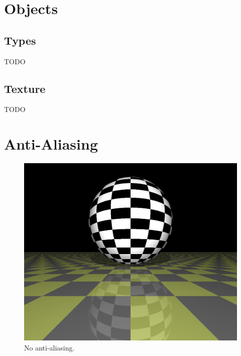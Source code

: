 \documentclass{article}
\begin{document}
\section{Objects}

\subsection{Types}

TODO

\subsection{Texture}

TODO

\section{Anti-Aliasing}

\begin{figure}[H]
    \includegraphics[width=\textwidth]{./examples/AntiAliasingComparison/Scene_noAntiAliasing.png}
    \caption{No anti-aliasing.}
\end{figure}
\end{document}
